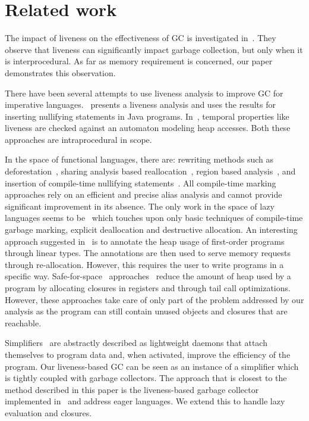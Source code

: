\documentclass[9pt,nonatbib]{sigplanconf}
\begin{document}
\vspace*{-2mm}
\section{Related work} 
\label{sec:relatedwork}
The impact of  liveness on the effectiveness of  GC is
investigated in~\cite{Hirzel}.   They observe that  liveness can
significantly  impact   garbage  collection,  but  only   when  it  is
interprocedural.  As far as memory requirement is concerned, our paper
demonstrates this observation.

There have been  several attempts to use liveness  analysis to improve
GC for imperative  languages.~\cite{khedker07heap} presents a liveness
analysis and uses  the results for inserting  nullifying statements in
Java  programs. In~\cite{ran.shaham-sas03},  temporal properties  like
liveness  are checked  against an  automaton modeling  heap accesses.
Both these approaches are intraprocedural in scope.

In the space of functional languages, there are: rewriting methods
such as
deforestation~\cite{wadler88deforest,gill93ashort,chitil99deforest},
sharing analysis based reallocation~\cite{jones89compile}, region
based analysis~\cite{tofte98region}, and insertion of compile-time
nullifying statements~\cite{inoue88analysis, lee05static}.  All compile-time
marking approaches rely on an efficient and precise alias analysis and
cannot provide significant improvement in its absence. The only work
in the space of lazy languages seems to be~\cite{Hamilton}
which touches upon only basic techniques of compile-time garbage
marking, explicit deallocation and destructive allocation. An
interesting approach suggested in~\cite{HofmannJ03} is to annotate the
heap usage of first-order programs through linear types.  The
annotations are then used to serve memory requests through
re-allocation.  However, this requires the user to write programs in a
specific way.
%
Safe-for-space~\cite{appel.cps}              approaches~\cite{Clinger,
  shao00efficient}  reduce the  amount of  heap used  by a  program by
allocating   closures    in   registers   and   through    tail   call
optimizations. However, these approaches take care of only part of the
problem addressed  by our  analysis as the  program can  still contain
unused objects and closures that are reachable.
%

Simplifiers~\cite{ONeill}  are  abstractly  described  as  lightweight
daemons that  attach themselves to  program data and,  when activated,
improve the  efficiency of the  program. Our liveness-based GC  can be
seen as  an instance  of a  simplifier which  is tightly  coupled with
garbage  collectors.   The approach  that  is  closest to  the  method
described  in  this  paper  is the  liveness-based  garbage  collector
implemented  in~\cite{karkare07liveness,asati14lgc} and  address eager
languages. We extend this to handle lazy evaluation and closures.
 
\end{document}
